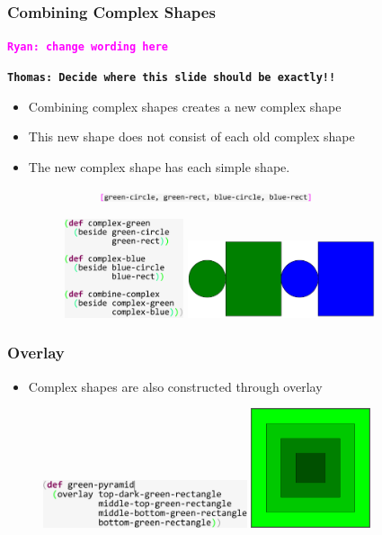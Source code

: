 \documentclass{beamer}
\newcommand{\comment}[1]{{\bf \tt  {#1}}}
\newcommand{\thcomment}[1]{\textcolor{BestBlue}{\comment{Thomas: {#1}}}}
\newcommand{\rmcomment}[1]{\textcolor{magenta}{\comment{Ryan: {#1}}}}
\begin{document}
\begin{frame}
\frametitle{Combining Complex Shapes}
	\rmcomment{change wording here}
	
	\thcomment{Decide where this slide should be exactly!!}
	\begin{itemize}
		\item Combining complex shapes creates a new complex shape
		\item This new shape does not consist of each old complex shape
		\item The new complex shape has each simple shape.
		\begin{figure}
			\vspace{.5cm}
			\begin{figure}
				\hspace{3.7cm}
				\vspace{-.5cm}
				\includegraphics[width=6.2cm]{PresentationImages/complexStructure.pdf}
			\end{figure}
			\includegraphics[width=3.5cm]{PresentationImages/twoComplexCode.pdf}
			\hspace{0.3cm}
			\includegraphics[width=5.5cm]{PresentationImages/twoComplex.pdf}
		\end{figure}
	\end{itemize}
\end{frame}

\begin{frame}
\frametitle{Overlay}
	\begin{itemize}
		\item Complex shapes are also constructed through overlay
	\end{itemize}
	\begin{figure}
	\includegraphics[width=6cm]{PresentationImages/greenHoleCode.pdf}
	\hspace{1cm}
	\includegraphics[width=3.5cm]{PresentationImages/greenHole.png}
	\end{figure}
\end{frame}
\end{document}
